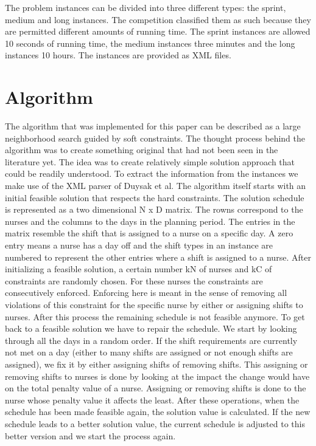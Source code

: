 \documentclass{article}
\begin{document}
The problem instances can be divided into three different types: the sprint, medium and long instances. The competition classified them as such because they are permitted different amounts of running time. The sprint instances are allowed 10 seconds of running time, the medium instances three minutes and the long instances 10 hours. The instances are provided as XML files.

\section{Algorithm}
The algorithm that was implemented for this paper can be described as a large neighborhood search guided by soft constraints. The thought process behind the algorithm was to create something original that had not been seen in the literature yet. The idea was to create relatively simple solution approach that could be readily understood. 
To extract the information from the instances we make use of the XML parser of Duysak et al.
The algorithm itself starts with an initial feasible solution that respects the hard constraints. The solution schedule is represented as a two dimensional N x D matrix. The rowns correspond to the nurses and the columns to the days in the planning period. The entries in the matrix resemble the shift that is assigned to a nurse on a specific day. A zero entry means a nurse has a day off and the shift types in an instance are numbered to represent the other entries where a shift is assigned to a nurse.
After initializing a feasible solution, a certain number kN of nurses and kC of constraints are randomly chosen. For these nurses the constraints are consecutively enforced. Enforcing here is meant in the sense of removing all violations of this constraint for the specific nurse by either or assigning shifts to nurses. After this process the remaining schedule is not feasible anymore. To get back to a feasible solution we have to repair the schedule. We start by looking through all the days in a random order. If the shift requirements are currently not met on a day (either to many shifts are assigned or not enough shifts are assigned), we fix it by either assigning shifts of removing shifts. This assigning or removing shifts to nurses is done by looking at the impact the change would have on the total penalty value of a nurse. Assigning or removing shifts is done to the nurse whose penalty value it affects the least.
After these operations, when the schedule has been made feasible again, the solution value is calculated. If the new schedule leads to a better solution value, the current schedule is adjusted to this better version and we start the process again.
\end{document}
